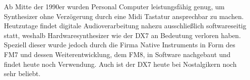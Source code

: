 Ab Mitte der 1990er wurden Personal Computer leistungsfähig genug, um Synthesizer ohne Verzögerung durch eine Midi Tastatur ansprechbar zu machen. Heutzutage findet digitale Audioverarbeitung nahezu ausschließlich softwareseitig statt, weshalb Hardwaresynthesizer wie der DX7 an Bedeutung verloren haben. Speziell dieser wurde jedoch durch die Firma Native Instruments in Form des FM7 und dessen Weiterentwicklung, dem FM8, in Software nachgebaut und findet heute noch Verwendung. Auch ist der DX7 heute bei Nostalgikern noch sehr beliebt.

